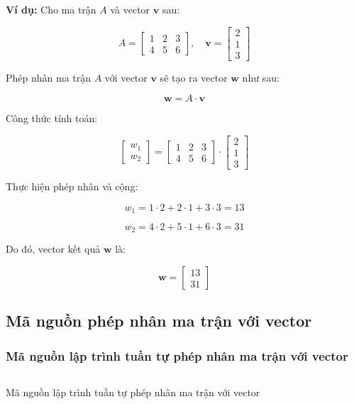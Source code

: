 \textbf{Ví dụ:}
Cho ma trận \( A \) và vector \( \mathbf{v} \) sau:

\[ A = \begin{bmatrix} 1 & 2 & 3 \\ 4 & 5 & 6 \end{bmatrix}, \quad \mathbf{v} = \begin{bmatrix} 2 \\ 1 \\ 3 \end{bmatrix} \]

Phép nhân ma trận \( A \) với vector \( \mathbf{v} \) sẽ tạo ra vector \( \mathbf{w} \) như sau:

\[ \mathbf{w} = A \cdot \mathbf{v} \]

Công thức tính toán:

\[ \begin{bmatrix} w_1 \\ w_2 \end{bmatrix} = \begin{bmatrix} 1 & 2 & 3 \\ 4 & 5 & 6 \end{bmatrix} \cdot \begin{bmatrix} 2 \\ 1 \\ 3 \end{bmatrix} \]

Thực hiện phép nhân và cộng:

\[ w_1 = 1 \cdot 2 + 2 \cdot 1 + 3 \cdot 3 = 13 \]

\[ w_2 = 4 \cdot 2 + 5 \cdot 1 + 6 \cdot 3 = 31 \]

Do đó, vector kết quả \( \mathbf{w} \) là:

\[ \mathbf{w} = \begin{bmatrix} 13 \\ 31 \end{bmatrix} \]

\subsection{Mã nguồn phép nhân ma trận với vector}

\subsubsection{Mã nguồn lập trình tuần tự phép nhân ma trận với vector}
\begin{listing}[H]
    \centering
    \inputminted{cpp}{sources/MaNguon1TT.cpp}
    \caption{Mã nguồn lập trình tuần tự phép nhân ma trận với vector}
    \label{code:MaNguon1TT}
\end{listing}

